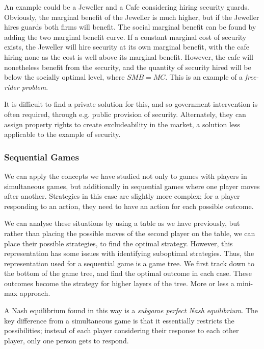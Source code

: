 \documentclass[12pt]{report}
\begin{document}
\begin{flushleft}
\bigskip
An example could be a Jeweller and a Cafe considering hiring security guards.
Obviously, the marginal benefit of the Jeweller is much higher, but if the
Jeweller hires guards both firms will benefit. The social marginal benefit
can be found by adding the two marginal benefit curve. If a constant marginal
cost of security exists, the Jeweller will hire security at its own marginal
benefit, with the cafe hiring none as the cost is well above its marginal
benefit. However, the cafe will nonetheless benefit from the security, and the
quantity of security hired will be below the socially optimal level, where 
\(SMB = MC\). This is an example of a \textit{free-rider problem}.

\bigskip
It is difficult to find a private solution for this, and so government 
intervention is often required, through e.g. public provision of security.
Alternately, they can assign property rights to create excludeability in the
market, a solution less applicable to the example of security.

\subsubsection*{Sequential Games}
We can apply the concepts we have studied not only to games with players in
simultaneous games, but additionally in sequential games where one player moves
after another. Strategies in this case are slightly more complex; for a player
responding to an action, they need to have an action for each possible outcome.

\bigskip
We can analyse these situations by using a table as we have previously, but
rather than placing the possible moves of the second player on the table, we
can place their possible strategies, to find the optimal strategy. However, 
this representation has some issues with identifying suboptimal strategies.
Thus, the representation used for a sequential game is a game tree. We first
track down to the bottom of the game tree, and find the optimal outcome in each
case. These outcomes become the strategy for higher layers of the tree. More or
less a mini-max approach.

\bigskip
A Nash equilibrium found in this way is a \textit{subgame perfect Nash 
equilibrium}. The key difference from a simultaneous game is that it 
essentially restricts the possibilities; instead of each player considering
their response to each other player, only one person gets to respond.

\end{flushleft}
\end{document}
